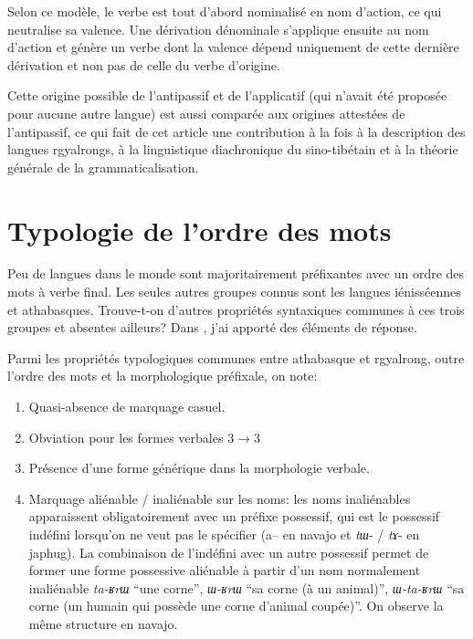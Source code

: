 \documentclass[oldfontcommands,oneside,a4paper,11pt]{memoir}
\begin{document}
Selon ce modèle, le verbe est tout d'abord nominalisé en nom d'action, ce qui neutralise  sa valence. Une dérivation dénominale  s'applique ensuite au nom d'action et génère un verbe dont la valence dépend uniquement de cette dernière dérivation et non pas de celle du verbe d'origine. 

Cette origine possible de l'antipassif et de l'applicatif (qui n'avait   été proposée pour aucune autre langue) est aussi comparée aux origines attestées de l'antipassif, ce qui fait de cet article une contribution à la fois à la description des langues rgyalrongs, à la linguistique diachronique du sino-tibétain et à la théorie générale de la grammaticalisation.


\section{Typologie de l'ordre des mots} \label{sec:ordre}

Peu de langues dans le monde sont majoritairement préfixantes avec un ordre des mots à verbe final. Les seules autres groupes connus sont les langues iénisséennes et athabasques. Trouve-t-on d'autres propriétés syntaxiques communes à ces trois groupes  et absentes ailleurs? Dans \citet{jacques13harmonization}, j'ai apporté des éléments de réponse.

Parmi les propriétés typologiques communes entre athabasque et rgyalrong, outre l'ordre des mots et la morphologique préfixale, on note:

 \begin{enumerate}
\item Quasi-absence de marquage casuel.

\item Obviation pour les formes verbales 3$\rightarrow$3

\item Présence d'une forme générique dans la morphologie verbale.

\item Marquage aliénable / inaliénable sur les noms: les noms inaliénables apparaissent obligatoirement avec un préfixe possessif, qui est le possessif indéfini lorsqu'on ne veut pas le spécifier (a-- en navajo et \textit{tɯ}- / \textit{tɤ}- en japhug). La combinaison de l'indéfini avec un autre possessif permet de former une forme possessive aliénable à partir d'un nom normalement inaliénable \textit{ta-ʁrɯ} ``une corne'', \textit{ɯ-ʁrɯ} ``sa corne (à un animal)'', \textit{ɯ-ta-ʁrɯ} ``sa corne (un humain qui possède une corne d'animal coupée)''. On observe la même structure en navajo.
\end{enumerate}
\end{document}

